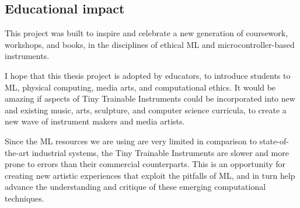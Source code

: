 \subsection{Educational impact}

This project was built to inspire and celebrate a new generation of coursework, workshops, and books, in the disciplines of ethical \acrshort{ML} and microcontroller-based instruments.

I hope that this thesis project is adopted by educators, to introduce students to \acrshort{ML}, physical computing, media arts, and computational ethics. It would be amazing if aspects of Tiny Trainable Instruments could be incorporated into new and existing music, arts, sculpture, and computer science curricula, to create a new wave of instrument makers and media artists.

Since the \acrshort{ML} resources we are using are very limited in comparison to state-of-the-art industrial systems, the Tiny Trainable Instruments are slower and more prone to errors than their commercial counterparts. This is an opportunity for creating new artistic experiences that exploit the pitfalls of \acrshort{ML}, and in turn help advance the understanding and critique of these emerging computational techniques.
